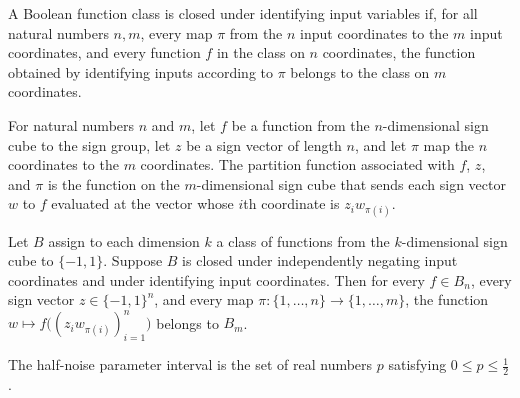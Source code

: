 \begin{definition}
\label{FABL.IsClosedUnderIdentifyingInputVariables}
\leanok
{}
A Boolean function class is closed under identifying input variables if, for all natural
numbers $n,m$, every map $\pi$ from the $n$ input coordinates to the $m$ input
coordinates, and every function $f$ in the class on $n$ coordinates, the function
obtained by identifying inputs according to $\pi$ belongs to the class on $m$
coordinates.
\end{definition}

\begin{definition}
\label{FABL.partitionFunction}
\leanok
{}
For natural numbers $n$ and $m$, let $f$ be a function from the $n$-dimensional sign
cube to the sign group, let $z$ be a sign vector of length $n$, and let $\pi$ map the
$n$ coordinates to the $m$ coordinates. The partition function associated with $f$, $z$,
and $\pi$ is the function on the $m$-dimensional sign cube that sends each sign vector
$w$ to $f$ evaluated at the vector whose $i$th coordinate is $z_i w_{\pi(i)}$.
\end{definition}

\begin{theorem}
\label{FABL.partitionFunction_mem}
\leanok
{}
Let $B$ assign to each dimension $k$ a class of functions from the $k$-dimensional sign
cube to $\{-1,1\}$. Suppose $B$ is closed under independently negating input coordinates
and under identifying input coordinates. Then for every $f\in B_n$, every sign vector
$z\in\{-1,1\}^n$, and every map $\pi:\{1,\ldots,n\}\to\{1,\ldots,m\}$, the function
$w\mapsto f\bigl((z_iw_{\pi(i)})_{i=1}^n\bigr)$ belongs to $B_m$.
\end{theorem}

\begin{definition}
\label{FABL.HalfNoiseParameter}
\leanok
The half-noise parameter interval is the set of real numbers $p$ satisfying $0 \le p \le
\tfrac12$.
\end{definition}

